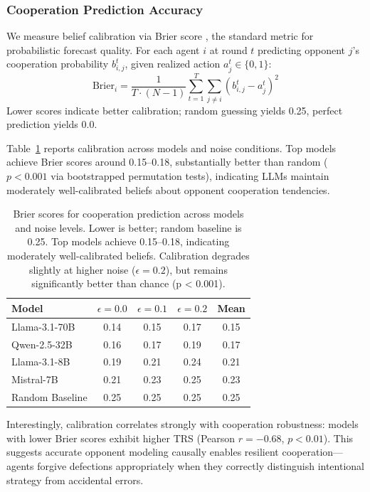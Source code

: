 \documentclass{uai2026} %
\begin{document}
\subsubsection{Cooperation Prediction Accuracy}

We measure belief calibration via Brier score \citep{brier1950verification}, the standard metric for probabilistic forecast quality. For each agent $i$ at round $t$ predicting opponent $j$'s cooperation probability $b_{i,j}^t$, given realized action $a_j^t \in \{0,1\}$:
\begin{equation}
    \text{Brier}_i = \frac{1}{T \cdot (N-1)} \sum_{t=1}^T \sum_{j \neq i} (b_{i,j}^t - a_j^t)^2
\end{equation}
Lower scores indicate better calibration; random guessing yields 0.25, perfect prediction yields 0.0.

Table~\ref{tab:brier} reports calibration across models and noise conditions. Top models achieve Brier scores around 0.15--0.18, substantially better than random ($p < 0.001$ via bootstrapped permutation tests), indicating LLMs maintain moderately well-calibrated beliefs about opponent cooperation tendencies.

\begin{table}[h]
\centering
\begin{tabular}{lcccc}
\toprule
\textbf{Model} & \textbf{$\epsilon=0.0$} & \textbf{$\epsilon=0.1$} & \textbf{$\epsilon=0.2$} & \textbf{Mean} \\
\midrule
Llama-3.1-70B & 0.14 & 0.15 & 0.17 & 0.15 \\
Qwen-2.5-32B & 0.16 & 0.17 & 0.19 & 0.17 \\
Llama-3.1-8B & 0.19 & 0.21 & 0.24 & 0.21 \\
Mistral-7B & 0.21 & 0.23 & 0.25 & 0.23 \\
\midrule
Random Baseline & 0.25 & 0.25 & 0.25 & 0.25 \\
\bottomrule
\end{tabular}
\caption{Brier scores for cooperation prediction across models and noise levels. Lower is better; random baseline is 0.25. Top models achieve 0.15--0.18, indicating moderately well-calibrated beliefs. Calibration degrades slightly at higher noise ($\epsilon=0.2$), but remains significantly better than chance (p < 0.001).}
\label{tab:brier}
\end{table}

Interestingly, calibration correlates strongly with cooperation robustness: models with lower Brier scores exhibit higher TRS (Pearson $r = -0.68$, $p < 0.01$). This suggests accurate opponent modeling causally enables resilient cooperation---agents forgive defections appropriately when they correctly distinguish intentional strategy from accidental errors.
\end{document}
